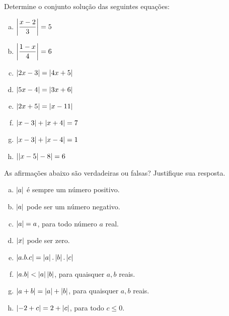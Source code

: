 \begin{secExercicios}
\begin{exer}
    Determine o conjunto solução das seguintes equações:
    \begin{enumerate}[a)]
        \item $\left|\dfrac{x-2}{3}\right| =5$
        \item $\left|\dfrac{1-x}{4}\right|=6$
        \item $\left|2x-3\right| = \left|4x+5\right|$
        \item $\left|5x-4\right| = \left|3x+6\right|$
        \item $\left|2x+5\right| = \left|x-11\right|$
        \item $\left|x-3\right| + \left|x+4\right| = 7$
        \item $\left|x-3\right| + \left|x-4\right|=1$
        \item $\left|\left|x-5\right| -8\right| = 6$
    \end{enumerate}
\end{exer}





\begin{exer}
    As afirmações abaixo são verdadeiras ou falsas? Justifique sua resposta.
    \begin{enumerate}[a)]
        \item $\left|a\right|$ é sempre um número positivo.
        \item $\left|a\right|$ pode ser um número negativo.
        \item $\left|a\right| = a$, para todo número $a$ real.
        \item $\left|x\right|$ pode ser zero.
        \item $\left|a.b.c\right| = \left|a\right|.\left|b\right|.\left|c\right|$
        \item $\left|a.b\right| < \left|a\right|\left|b\right|$, para quaisquer $a,b$ reais.
        \item $\left|a + b\right| = \left|a\right| + \left|b\right|$, para quaisquer $a, b$ reais.
        \item $\left|-2 + c\right| = 2 + \left|c\right|$, para todo $c \leq 0$.
     \end{enumerate}
\end{exer}

\end{secExercicios}


